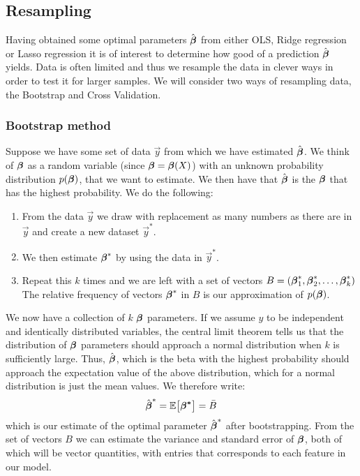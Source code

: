 \subsection{Resampling}\label{sec:resampling}
Having obtained some optimal parameters $\hat{\boldsymbol{\beta}}$ from either OLS, Ridge regression or Lasso regression it is of interest to determine how good of a prediction $\hat{\boldsymbol{\beta}}$ yields. Data is often limited and thus we resample the data in clever ways in order to test it for larger samples. We will consider two ways of resampling data, the Bootstrap and Cross Validation. 

\subsubsection{Bootstrap method}\label{sec:bootstrap}
Suppose we have some set of data $\vec{y}$ from which we have estimated $\hat{\boldsymbol{\beta}}$. We think of $\boldsymbol{\beta}$ as a random variable (since $\boldsymbol{\beta}=\boldsymbol{\beta}(X)$) with an unknown probability distribution $p(\mathbf{\boldsymbol{\beta}})$, that we want to estimate. We then have that $\hat{\boldsymbol{\beta}}$ is the $\boldsymbol{\beta}$ that has the highest probability. We do the following:
\begin{enumerate}
    \item From the data $\vec{y}$ we draw with replacement as many numbers as there are in $\vec{y}$ and create a new dataset $\vec{y}^*$.
    \item We then estimate $\boldsymbol{\beta}^*$ by using the data in $\vec{y}^*$. 
    \item Repeat this $k$ times and we are left with a set of vectors $B = (\boldsymbol{\beta}^*_1, \boldsymbol{\beta}^*_2, \dots, \boldsymbol{\beta}^*_k)$ The relative frequency of vectors $\boldsymbol{\beta}^*$ in $B$ is our approximation of $p(\boldsymbol{\beta})$. 
\end{enumerate}
We now have a collection of $k$ $\boldsymbol{\beta}$ parameters. If we assume $y$ to be independent and identically distributed variables, the central limit theorem tells us that the distribution of $\boldsymbol{\beta}$ parameters should approach a normal distribution when $k$ is sufficiently large. Thus, $\hat{\boldsymbol{\beta}}$, which is the beta with the highest probability should approach the expectation value of the above distribution, which for a normal distribution is just the mean values. We therefore write:
\begin{align*}
    \hat{\boldsymbol{\beta}}^* = \mathbb{E}\big[\boldsymbol{\beta^*}\big] = \bar{B} 
\end{align*}
which is our estimate of the optimal parameter $\hat{\boldsymbol{\beta}}^*$ after bootstrapping. From the set of vectors $B$ we can estimate the variance and standard error of $\boldsymbol{\beta}$, both of which will be vector quantities, with entries that corresponds to each feature in our model. 

